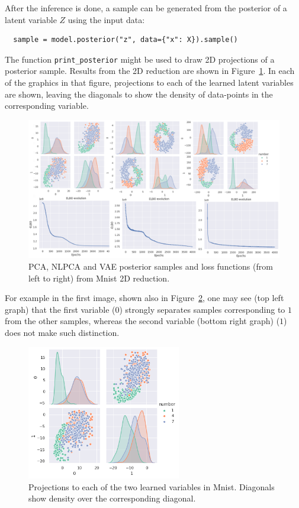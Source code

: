 After the inference is done, a sample can be generated from the posterior of a latent variable \(Z\) using the input data:
\begin{verbatim}
  sample = model.posterior("z", data={"x": X}).sample()
\end{verbatim}

The function \texttt{print\_posterior} might be used to draw 2D projections of a posterior sample. Results from the 2D reduction are shown in Figure~\ref{fig:mnist_posterior_2D}. In each of the graphics in that figure, projections to each of the learned latent variables are shown, leaving the diagonals to show the density of data-points in the corresponding variable.


\begin{figure}[ht]
  \centering
  \includegraphics[width = 1\textwidth]{tex/images/mnist_2D.png}
  \caption{PCA, NLPCA and VAE posterior samples and loss functions (from left to right) from Mnist 2D reduction.}\label{fig:mnist_posterior_2D}
\end{figure}

For example in the first image, shown also in Figure~\ref{fig:mnist_pca_2D}, one may see (top left graph) that the first variable (\(0\)) strongly separates samples corresponding to \(1\) from the other samples, whereas the second variable (bottom right graph) (\(1\)) does not make such distinction.

\begin{figure}
  \centering
  \includegraphics[width = 0.6\textwidth]{tex/images/mnist_pca_2D.png}
  \caption{Projections to each of the two learned variables in Mnist. Diagonals show density over the corresponding diagonal.}\label{fig:mnist_pca_2D}
\end{figure}

